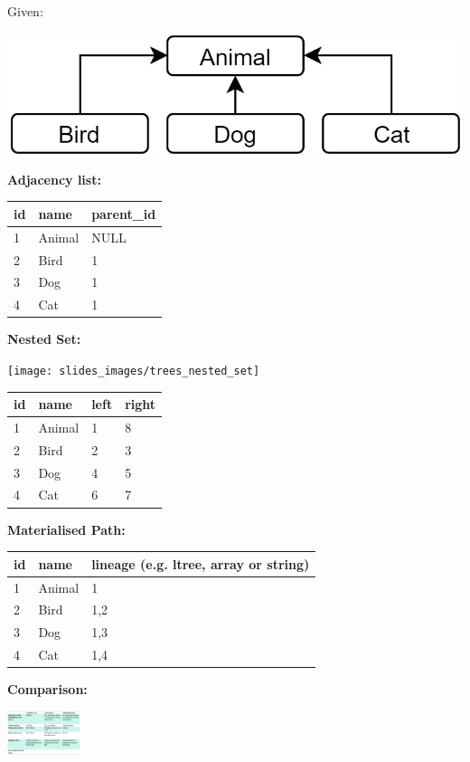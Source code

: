 \begin{breakbox}

Given:
\begin{center}
	\includegraphics[width=.08\textwidth]{slides_images/tree_given_example}
\end{center}

\textbf{Adjacency list:}

\begin{tabular}{lll}
id & name   & parent\_id \\
\hline
1  & Animal & NULL       \\
2  & Bird   & 1          \\
3  & Dog    & 1          \\
4  & Cat    & 1         
\end{tabular}

\textbf{Nested Set:}
\begin{center}
	\texttt{[image: slides\_images/trees\_nested\_set]}
\end{center}

\begin{tabular}{llll}
id & name   & left & right \\
\hline
1  & Animal & 1    & 8     \\
2  & Bird   & 2    & 3     \\
3  & Dog    & 4    & 5     \\
4  & Cat    & 6    & 7    
\end{tabular}

\textbf{Materialised Path:}

\begin{tabular}{lll}
id & name   & lineage (e.g. ltree, array or string) \\
\hline
1  & Animal & 1                    \\
2  & Bird   & 1,2                  \\
3  & Dog    & 1,3                  \\
4  & Cat    & 1,4                 
\end{tabular}

\textbf{Comparison:}
\begin{center}
	\includegraphics[width=0.16\textwidth]{slides_images/comparison_tree_data.png}
\end{center}
\end{breakbox}

